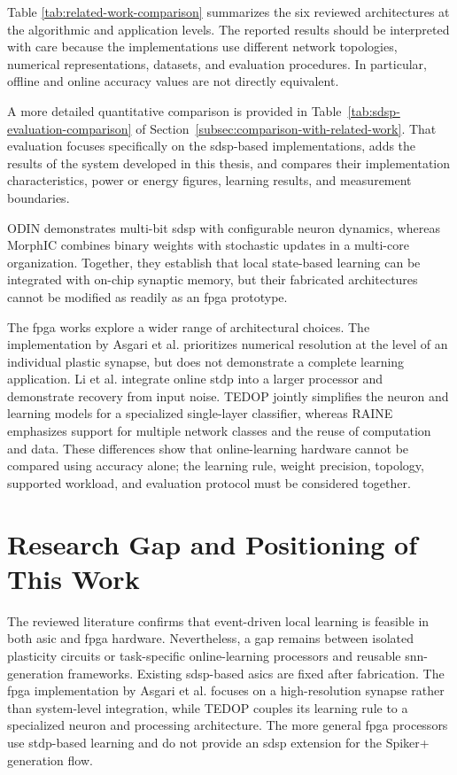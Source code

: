 Table \ref{tab:related-work-comparison} summarizes the six reviewed architectures at the algorithmic and application levels. The reported results should be interpreted with care because the implementations use different network topologies, numerical representations, datasets, and evaluation procedures. In particular, offline and online accuracy values are not directly equivalent.

A more detailed quantitative comparison is provided in Table~\ref{tab:sdsp-evaluation-comparison} of Section~\ref{subsec:comparison-with-related-work}. That evaluation focuses specifically on the \gls{sdsp}-based implementations, adds the results of the system developed in this thesis, and compares their implementation characteristics, power or energy figures, learning results, and measurement boundaries.



ODIN demonstrates multi-bit \gls{sdsp} with configurable neuron dynamics, whereas MorphIC combines binary weights with stochastic updates in a multi-core organization. Together, they establish that local state-based learning can be integrated with on-chip synaptic memory, but their fabricated architectures cannot be modified as readily as an \gls{fpga} prototype.

The \gls{fpga} works explore a wider range of architectural choices. The implementation by Asgari et al. prioritizes numerical resolution at the level of an individual plastic synapse, but does not demonstrate a complete learning application. Li et al. integrate online \gls{stdp} into a larger processor and demonstrate recovery from input noise. TEDOP jointly simplifies the neuron and learning models for a specialized single-layer classifier, whereas RAINE emphasizes support for multiple network classes and the reuse of computation and data. These differences show that online-learning hardware cannot be compared using accuracy alone; the learning rule, weight precision, topology, supported workload, and evaluation protocol must be considered together.

\section{Research Gap and Positioning of This Work}
\label{subsec: research gap and positioning of this work}

The reviewed literature confirms that event-driven local learning is feasible in both \gls{asic} and \gls{fpga} hardware. Nevertheless, a gap remains between isolated plasticity circuits or task-specific online-learning processors and reusable \gls{snn}-generation frameworks. Existing \gls{sdsp}-based \gls{asic}s are fixed after fabrication. The \gls{fpga} implementation by Asgari et al. focuses on a high-resolution synapse rather than system-level integration, while TEDOP couples its learning rule to a specialized neuron and processing architecture. The more general \gls{fpga} processors use \gls{stdp}-based learning and do not provide an \gls{sdsp} extension for the Spiker+ generation flow.

